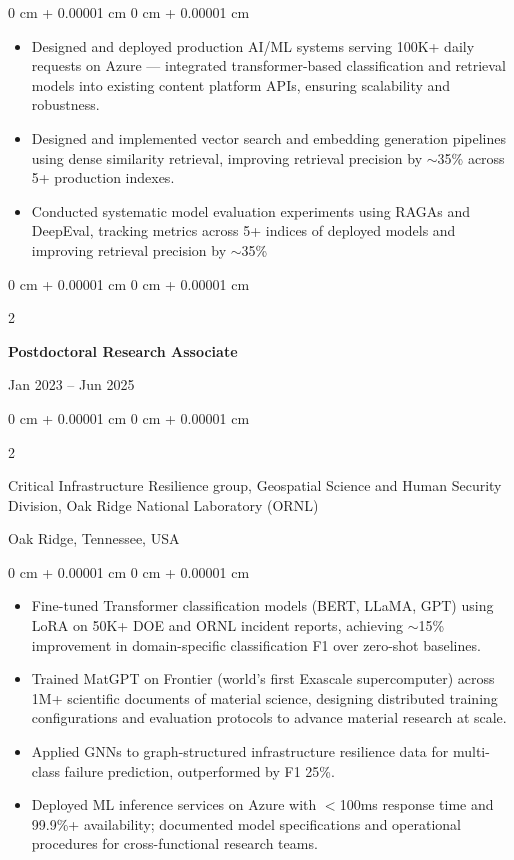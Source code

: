 \documentclass[10pt, letterpaper]{article}
\newenvironment{highlights}{
    \begin{itemize}[
        topsep=0.10 cm,
        parsep=0.10 cm,
        partopsep=0pt,
        itemsep=0pt,
        leftmargin=0 cm + 10pt
    ]
}{
    \end{itemize}
} %
\newenvironment{onecolentry}{
    \begin{adjustwidth}{
        0 cm + 0.00001 cm
    }{
        0 cm + 0.00001 cm
    }
}{
    \end{adjustwidth}
} %
\newenvironment{twocolentry}[2][]{
    \onecolentry
    \def\secondColumn{#2}
    \setcolumnwidth{\fill, 4.5 cm}
    \begin{paracol}{2}
}{
    \switchcolumn \raggedleft \secondColumn
    \end{paracol}
    \endonecolentry
} %
\begin{document}
    \begin{onecolentry}
        \begin{highlights}
            \item Designed and deployed production AI/ML systems serving 100K+ daily requests on Azure — integrated transformer-based classification and retrieval models into existing content platform APIs, ensuring scalability and robustness.
            \item Designed and implemented vector search and embedding generation pipelines using dense similarity retrieval, improving retrieval precision by $\sim$35\% across 5+ production indexes.
            \item Conducted systematic model evaluation experiments using RAGAs and DeepEval, tracking metrics across 5+ indices of deployed models and improving retrieval precision by $\sim$35\%
        \end{highlights}
    \end{onecolentry}

\vspace{1mm}

    \begin{twocolentry}{Jan 2023 -- Jun 2025}
        \textbf{Postdoctoral Research Associate}
    \end{twocolentry}
    \begin{twocolentry}{Oak Ridge, Tennessee, USA}
        Critical Infrastructure Resilience group, Geospatial Science and Human Security Division, Oak Ridge National Laboratory (ORNL)
    \end{twocolentry}
    \vspace{0.10 cm}
    \begin{onecolentry}
        \begin{highlights}
            \item Fine-tuned Transformer classification models (BERT, LLaMA, GPT) using LoRA on 50K+ DOE and ORNL incident reports, achieving $\sim$15\% improvement in domain-specific classification F1 over zero-shot baselines.
            \item Trained MatGPT on Frontier (world’s first Exascale supercomputer) across 1M+ scientific documents of material science, designing distributed training configurations and evaluation protocols to advance material research at scale.
            \item Applied GNNs to graph-structured infrastructure resilience data for multi-class failure prediction, outperformed by F1 25\%.
            \item Deployed ML inference services on Azure with $<$100ms response time and 99.9\%+ availability; documented model specifications and operational procedures for cross-functional research teams.
        \end{highlights}
    \end{onecolentry}
\end{document}
